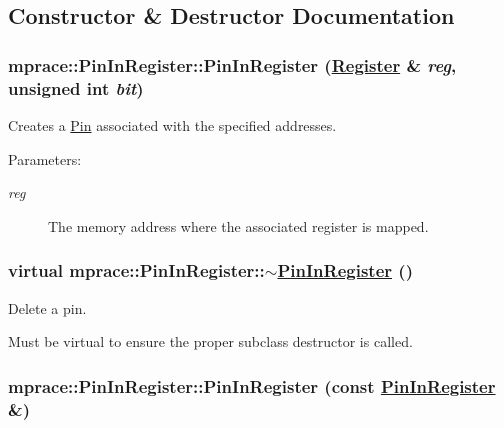 \subsection{Constructor \& Destructor Documentation}
\hypertarget{classmprace_1_1PinInRegister_a0}{
\subsubsection[PinInRegister]{\setlength{\rightskip}{0pt plus 5cm}mprace::Pin\-In\-Register::Pin\-In\-Register (\hyperlink{classmprace_1_1Register}{Register} \& {\em reg}, unsigned int {\em bit})}}
\label{classmprace_1_1PinInRegister_a0}


Creates a \hyperlink{classmprace_1_1Pin}{Pin} associated with the specified addresses. 

\begin{Desc}
\item[Parameters:]
\begin{description}
\item[{\em reg}]The memory address where the associated register is mapped.\end{description}
\end{Desc}
\hypertarget{classmprace_1_1PinInRegister_a1}{
\subsubsection[$\sim$PinInRegister]{\setlength{\rightskip}{0pt plus 5cm}virtual mprace::Pin\-In\-Register::$\sim$\hyperlink{classmprace_1_1PinInRegister}{Pin\-In\-Register} ()}}
\label{classmprace_1_1PinInRegister_a1}


Delete a pin. 

Must be virtual to ensure the proper subclass destructor is called.\hypertarget{classmprace_1_1PinInRegister_b0}{
\subsubsection[PinInRegister]{\setlength{\rightskip}{0pt plus 5cm}mprace::Pin\-In\-Register::Pin\-In\-Register (const \hyperlink{classmprace_1_1PinInRegister}{Pin\-In\-Register} \&)}}
\label{classmprace_1_1PinInRegister_b0}


